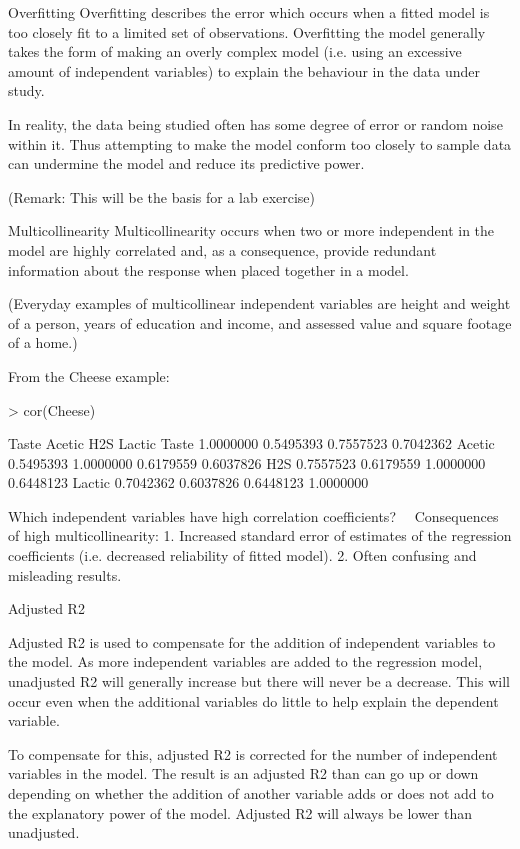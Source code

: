 

Overfitting
Overfitting  describes the error which occurs when a fitted model is too closely fit to a limited set of observations. Overfitting the model generally takes the form of making an overly complex model (i.e. using an excessive amount of independent variables) to explain the behaviour in the data under study. 

In reality, the data being studied often has some degree of error or random noise within it. Thus attempting to make the model conform too closely to sample data can undermine the model and reduce its predictive power.

(Remark: This will be the basis for a lab exercise)

Multicollinearity 
Multicollinearity occurs when two or more independent in the model are
highly correlated and, as a consequence, provide redundant information about the response when placed together in a model.

(Everyday examples of multicollinear independent variables are height and weight of a person, years of education and income, and assessed value and square footage of a home.)

From the Cheese example:

> cor(Cheese)

Taste    Acetic       H2S    Lactic
Taste  1.0000000 0.5495393 0.7557523 0.7042362
Acetic 0.5495393 1.0000000 0.6179559 0.6037826
H2S    0.7557523 0.6179559 1.0000000 0.6448123
Lactic 0.7042362 0.6037826 0.6448123 1.0000000

Which independent variables have high correlation coefficients? 
Consequences of high multicollinearity:
1. Increased standard error of estimates of the regression coefficients (i.e. decreased reliability of fitted model).
2. Often confusing and misleading results.

Adjusted R2

Adjusted R2 is used to compensate for the addition of independent variables to the model.  As more independent variables are added to the regression model, unadjusted R2 will generally increase but there will never be a decrease.  This will occur even when the additional variables do little to help explain the dependent variable.  

To compensate for this, adjusted R2 is corrected for the number of independent variables in the model.  The result is an adjusted R2 than can go up or down depending on whether the addition of another variable adds or does not add to the explanatory power of the model.  Adjusted R2 will always be lower than unadjusted.

